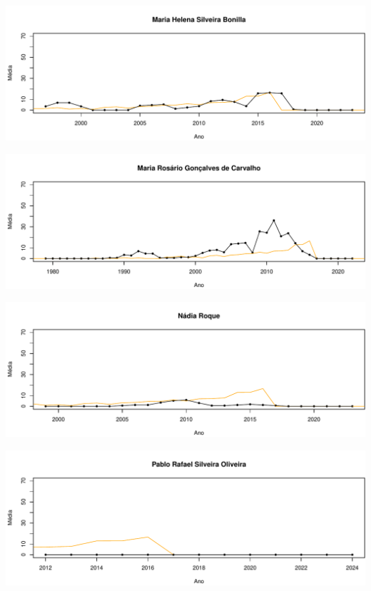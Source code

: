 \documentclass[12pt,brazil]{article}\usepackage[]{graphicx}\usepackage[]{xcolor}
\makeatletter
\def\maxwidth{ %
  \ifdim\Gin@nat@width>\linewidth
    \linewidth
  \else
    \Gin@nat@width
  \fi
}
\makeatother
\begin{document}
\vspace{0.5cm}


{\centering \includegraphics[width=\maxwidth]{figure/mediamovel-47} 

}



\vspace{0.5cm}


{\centering \includegraphics[width=\maxwidth]{figure/mediamovel-48} 

}



\vspace{0.5cm}


{\centering \includegraphics[width=\maxwidth]{figure/mediamovel-49} 

}



\vspace{0.5cm}


{\centering \includegraphics[width=\maxwidth]{figure/mediamovel-50} 

}
\end{document}
